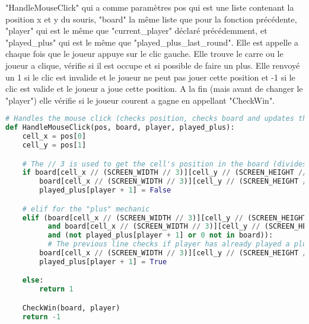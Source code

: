 \documentclass[12pt]{article}
\begin{document}
\newpage
"HandleMouseClick" qui a comme paramètres pos qui est une liste contenant la position x et y du souris, "board" la même liste que pour la fonction précédente, "player" qui est le même que "current\_player" déclaré précédemment, et "played\_plus" qui est le même que "played\_plus\_last\_round". Elle est appelle a chaque fois que le joueur appuye sur le clic gauche. Elle trouve le carre ou le joueur a clique, vérifie si il est occupe et si possible de faire un plus. Elle renvoyé un 1 si le clic est invalide et le joueur ne peut pas jouer cette position et -1 si le clic est valide et le joueur a joue cette position. A la fin (mais avant de changer le "player") elle vérifie si le joueur courent a gagne en appellant "CheckWin".
   \begin{lstlisting}[language=Python]
# Handles the mouse click (checks position, checks board and updates the board)
def HandleMouseClick(pos, board, player, played_plus):
    cell_x = pos[0]
    cell_y = pos[1]

    # The // 3 is used to get the cell's position in the board (divides the screen into 3x3 cells)
    if board[cell_x // (SCREEN_WIDTH // 3)][cell_y // (SCREEN_HEIGHT // 3)] == 0:
        board[cell_x // (SCREEN_WIDTH // 3)][cell_y // (SCREEN_HEIGHT // 3)] = player
        played_plus[player + 1] = False

    # elif for the "plus" mechanic
    elif (board[cell_x // (SCREEN_WIDTH // 3)][cell_y // (SCREEN_HEIGHT // 3)] != player
          and board[cell_x // (SCREEN_WIDTH // 3)][cell_y // (SCREEN_HEIGHT // 3)] != 2
          and (not played_plus[player + 1] or 0 not in board)):  
          # The previous line checks if player has already played a plus last round but if no other places available skip his turn (in reality just lets him play whatever he wants instead of skipping 2 turns)
        board[cell_x // (SCREEN_WIDTH // 3)][cell_y // (SCREEN_HEIGHT // 3)] = 2
        played_plus[player + 1] = True

    else:
        return 1

    CheckWin(board, player)
    return -1 \end{lstlisting}
\end{document}
